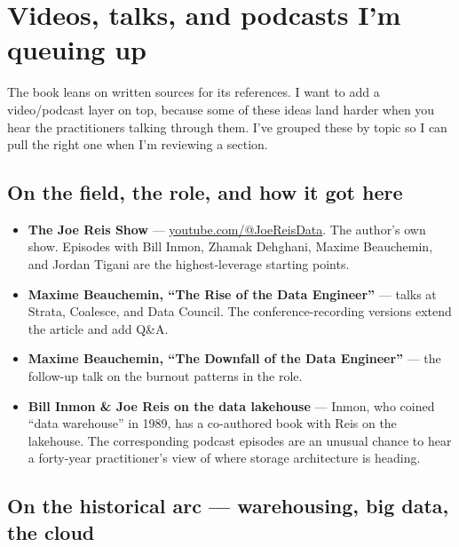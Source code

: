 \section{Videos, talks, and podcasts I'm queuing up}

The book leans on written sources for its references. I want to add a video/podcast layer on top, because some of these ideas land harder when you hear the practitioners talking through them. I've grouped these by topic so I can pull the right one when I'm reviewing a section.

\subsection*{On the field, the role, and how it got here}

\begin{itemize}[leftmargin=*]
  \item \textbf{The Joe Reis Show} --- \href{https://www.youtube.com/@JoeReisData}{youtube.com/@JoeReisData}. The author's own show. Episodes with Bill Inmon, Zhamak Dehghani, Maxime Beauchemin, and Jordan Tigani are the highest-leverage starting points.
  \item \textbf{Maxime Beauchemin, ``The Rise of the Data Engineer''} --- talks at Strata, Coalesce, and Data Council. The conference-recording versions extend the article and add Q\&A.
  \item \textbf{Maxime Beauchemin, ``The Downfall of the Data Engineer''} --- the follow-up talk on the burnout patterns in the role.
  \item \textbf{Bill Inmon \& Joe Reis on the data lakehouse} --- Inmon, who coined ``data warehouse'' in 1989, has a co-authored book with Reis on the lakehouse. The corresponding podcast episodes are an unusual chance to hear a forty-year practitioner's view of where storage architecture is heading.
\end{itemize}

\subsection*{On the historical arc — warehousing, big data, the cloud}

